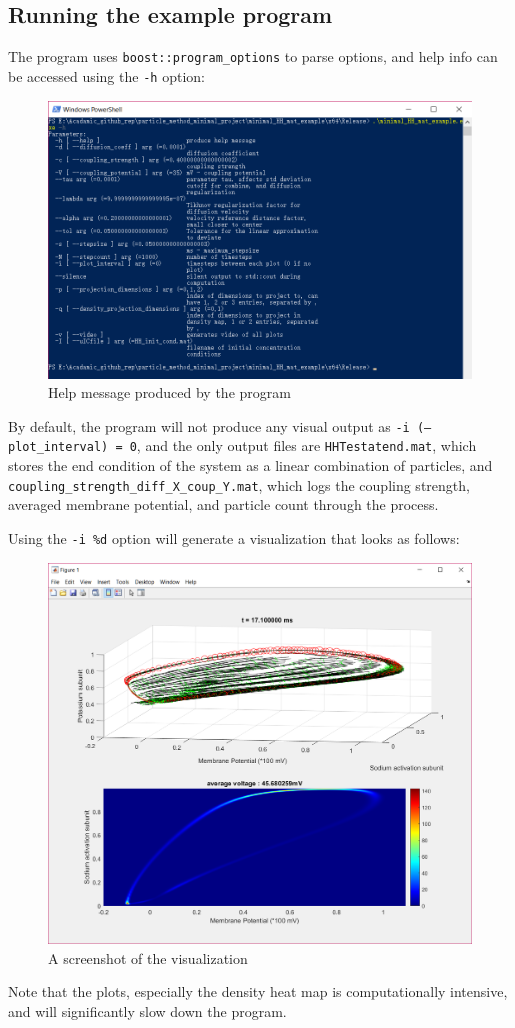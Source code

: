 \documentclass[10pt]{article} %
\begin{document}
\subsection{Running the example program}
The program uses \texttt{boost::program\_options} to parse options, and help info can be accessed using the \texttt{-h} option:
\begin{figure}[H]
\includegraphics[width=\textwidth]{help_message}
\caption{Help message produced by the program}
\end{figure}

By default, the program will not produce any visual output as \texttt{-i (--plot\_interval) = 0}, and the only output files are \texttt{HHTestatend.mat}, which stores the end condition of the system as a linear combination of particles, and \texttt{coupling\_strength\_diff\_X\_coup\_Y.mat}, which logs the coupling strength, averaged membrane potential, and particle count through the process. 

Using the \texttt{-i \%d} option will generate a visualization that looks as follows: 
\begin{figure}[H]
\includegraphics[width=\textwidth]{visualization_screenshot}
\caption{A screenshot of the visualization}
\end{figure}
Note that the plots, especially the density heat map is computationally intensive, and will significantly slow down the program. 
\end{document}

